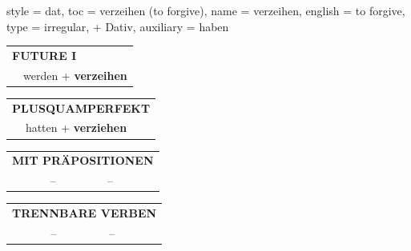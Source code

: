 \begin{verbentry}{
  style = {dat},
  toc = {verzeihen (to forgive)},
  name = {verzeihen},
  english = {to forgive},
  type = {irregular, + Dativ},
  auxiliary = {haben}
}
\begin{tabular}{rl}
    \multicolumn{2}{l}{\textbf{FUTURE I} }\\
   & werden + \textbf{verzeihen}\\
 
  \end{tabular}
\hfill
   \begin{tabular}{rl}
      \multicolumn{2}{l}{\textbf{PLUSQUAMPERFEKT}}\\
   & hatten + \textbf{verziehen}\\
  \end{tabular}

   \vspace{10pt}

   \begin{tabular}{lll}
      \multicolumn{3}{l}{\textbf{MIT PRÄPOSITIONEN}}\\
 & -- & --\\
\end{tabular}
  \hfill
   \begin{tabular}{lll}
      \multicolumn{3}{l}{\textbf{TRENNBARE VERBEN}}\\
 & -- & --\\
  \end{tabular}


  \vspace{-5pt}
\end{verbentry}

